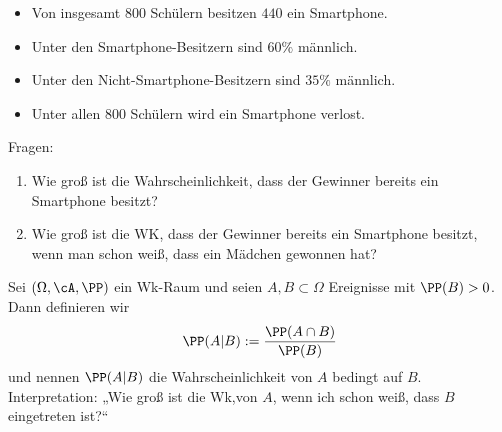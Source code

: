 \documentclass{scrreprt}
\renewenvironment{anumerate}{\begin{enumerate}[label=(\alph*)]}{\end{enumerate}} %
\begin{document}
\begin{itemize}
\item Von insgesamt $800$ Schülern besitzen $440$ ein Smartphone.
\item Unter den Smartphone-Besitzern sind $60\%$ männlich.
\item Unter den Nicht-Smartphone-Besitzern sind $35\%$ männlich.
\item Unter allen $800$ Schülern wird ein Smartphone verlost.
\end{itemize}
Fragen:
\begin{anumerate}
\item Wie groß ist die Wahrscheinlichkeit, dass der Gewinner bereits ein Smartphone besitzt?
\item Wie groß ist die WK, dass der Gewinner bereits ein Smartphone besitzt, wenn man schon weiß, dass ein Mädchen gewonnen hat?
\end{anumerate}

 Sei $(\Omega, \cA, \PP)$ ein Wk-Raum und seien $A, B \subset \Omega$ Ereignisse mit $\PP(B)>0$. Dann definieren wir $$\PP(A|B):=\frac{\PP(A \cap B)}{\PP(B)}$$ und nennen $\PP (A|B)$ die Wahrscheinlichkeit von $A$ bedingt auf $B$.\\
Interpretation: „Wie groß ist die Wk,von $A$, wenn ich schon weiß, dass $B$ eingetreten ist?“
\end{document}
